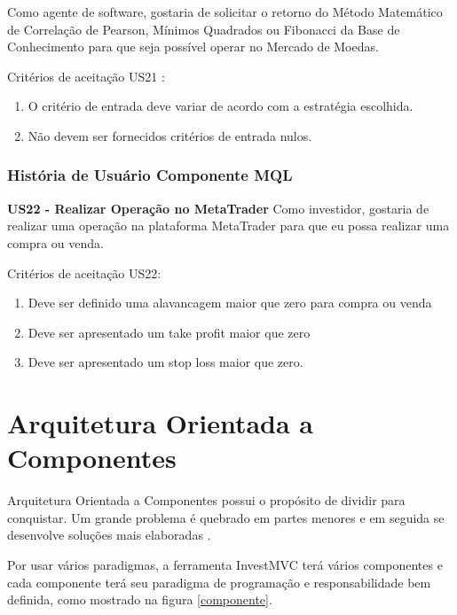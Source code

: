 Como agente de software, gostaria de solicitar o retorno do Método Matemático de Correlação de Pearson, Mínimos Quadrados ou Fibonacci da Base de Conhecimento para que seja possível operar no Mercado de Moedas.


Critérios de aceitação US21 :

\begin{enumerate}
\item O critério de entrada deve variar de acordo com a estratégia escolhida.
\item Não devem ser fornecidos critérios de entrada nulos.
\end{enumerate}

\subsubsection{História de Usuário Componente MQL}
\textbf{US22 - Realizar Operação no MetaTrader}
Como investidor, gostaria de realizar uma operação na plataforma MetaTrader para que eu possa realizar uma compra ou venda.

Critérios de aceitação US22:
\begin{enumerate}
\item Deve ser definido uma alavancagem maior que zero para compra ou venda
\item Deve ser apresentado um take profit maior que zero
\item Deve ser apresentado um stop loss maior que zero.

\end{enumerate}

\section{Arquitetura Orientada a Componentes}

Arquitetura Orientada a Componentes possui o propósito de dividir para conquistar. Um grande problema é quebrado em partes menores e em seguida se desenvolve soluções mais elaboradas \cite{john}.

Por usar vários paradigmas, a ferramenta InvestMVC terá vários componentes e cada componente terá seu paradigma de programação e responsabilidade bem definida, como mostrado na figura \ref{componente}.

